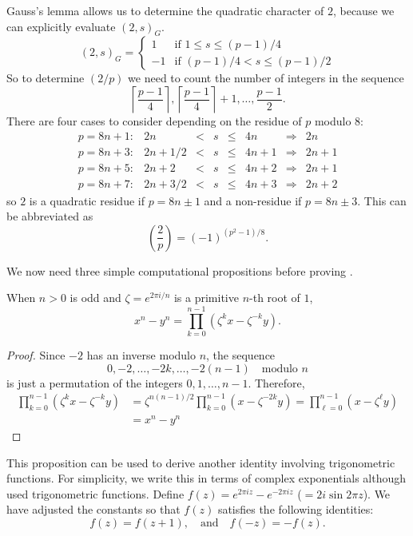 Gauss's lemma allows us to determine the quadratic character of $2$,
because we can explicitly evaluate $(2, s)_G$.
\[
(2, s)_G = \left\{
\begin{array}{ll}
1 & \mbox{if $1 \le s \le (p-1)/4$} \\
-1 & \mbox{if $(p-1)/4 < s \le (p-1)/2$} 
\end{array}
\right.
\]
So to determine $(2/p)$ we need to count the number of integers
in the sequence
\[
\left\lceil \frac{p-1}{4} \right\rceil, 
\left\lceil \frac{p-1}{4} \right\rceil + 1, \ldots, 
\frac{p-1}{2}.
\]
There are four cases to consider depending
on the residue of $p$ modulo $8$:
\[
\begin{array}{crccclcc}
p= 8n+1: & 2n     & < & s & \le & 4n   & \Longrightarrow & 2n \\
p= 8n+3: & 2n+1/2 & < & s & \le & 4n+1 & \Longrightarrow & 2n+1 \\
p= 8n+5: & 2n+2   & < & s & \le & 4n+2 & \Longrightarrow & 2n+1 \\
p= 8n+7: & 2n+3/2 & < & s & \le & 4n+3 & \Longrightarrow & 2n+2 
\end{array}
\]
so $2$ is a quadratic residue if $p = 8n\pm 1$ and a non-residue if $p
= 8n\pm3$.  This can be abbreviated as
\[
\left(\frac{2}{p}\right) = (-1)^{(p^2-1)/8}.
\]

We now need three simple computational propositions before proving
. 

\begin{proposition}\label{QR:Help:a:Prop}
When $n > 0$ is odd and $\zeta = e^{2\pi i / n}$ is a primitive
$n$-th root of $1$,
\[
x^n - y^n = \prod_{k = 0}^{n-1} ( \zeta^k x - \zeta^{-k} y).
\]
\end{proposition}
\begin{proof}
Since $-2$ has an inverse modulo $n$, the sequence
\[
0, -2, \ldots, -2k, \ldots , -2(n-1) \quad\mbox{modulo $n$}
\]
is just a permutation of the integers $0, 1, \ldots, n-1$.  Therefore,
\[
\begin{aligned}
  \prod_{k=0}^{n-1}(\zeta^k x - \zeta^{-k}y) 
     & = \zeta^{n(n-1)/2} \prod_{k=0}^{n-1}(x - \zeta^{-2k}y) 
       = \prod_{\ell=0}^{n-1}(x - \zeta^{\ell}y) \\
     & = x^n - y^n
\end{aligned}
\]
\end{proof}

This proposition can be used to derive another identity involving
trigonometric functions.  For simplicity, we write this in terms of
complex exponentials although {\Eisenstein} used trigonometric functions.
Define $f(z) = e^{2 \pi i z} - e^{-2 \pi i z}$ ($ = 2 i \sin 2\pi z$).
We have adjusted the constants so that $f(z)$ satisfies the following
identities:
\[
 f(z) = f(z+1),\quad \mbox{and} \quad f(-z) = - f(z).
\]

